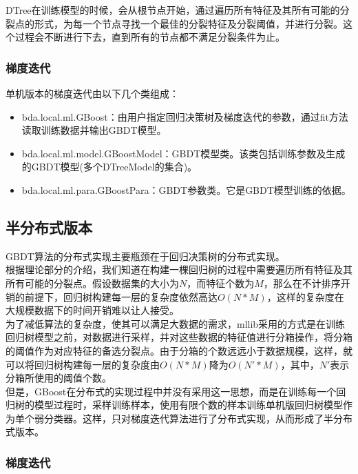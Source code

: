 \documentclass[a4paper,11pt,         %
               ]{article}
\begin{document}
DTree在训练模型的时候，会从根节点开始，通过遍历所有特征及其所有可能的分裂点的形式，为每一个节点寻找一个最佳的分裂特征及分裂阈值，并进行分裂。这个过程会不断进行下去，直到所有的节点都不满足分裂条件为止。

\subsubsection{梯度迭代}

单机版本的梯度迭代由以下几个类组成：
\begin{itemize}
	\item bda.local.ml.GBoost：由用户指定回归决策树及梯度迭代的参数，通过fit方法读取训练数据并输出GBDT模型。
	\item bda.local.ml.model.GBoostModel：GBDT模型类。该类包括训练参数及生成的GBDT模型(多个DTreeModel的集合)。
	\item bda.local.ml.para.GBoostPara：GBDT参数类。它是GBDT模型训练的依据。
\end{itemize}

\subsection{半分布式版本}

GBDT算法的分布式实现主要瓶颈在于回归决策树的分布式实现。 \\

根据理论部分的介绍，我们知道在构建一棵回归树的过程中需要遍历所有特征及其所有可能的分裂点。假设数据集的大小为$N$，而特征个数为$M$，那么在不计排序开销的前提下，回归树构建每一层的复杂度依然高达$O(N*M)$，这样的复杂度在大规模数据下的时间开销难以让人接受。 \\

为了减低算法的复杂度，使其可以满足大数据的需求，mllib采用的方式是在训练回归树模型之前，对数据进行采样，并对这些数据的特征值进行分箱操作，将分箱的阈值作为对应特征的备选分裂点。由于分箱的个数远远小于数据规模，这样，就可以将回归树构建每一层的复杂度由$O(N*M)$降为$O(N'*M)$，其中，$N'$表示分箱所使用的阈值个数。 \\

但是，GBoost在分布式的实现过程中并没有采用这一思想，而是在训练每一个回归树的模型过程时，采样训练样本，使用有限个数的样本训练单机版回归树模型作为单个弱分类器。这样，只对梯度迭代算法进行了分布式实现，从而形成了半分布式版本。

\subsubsection{梯度迭代}
\end{document}
